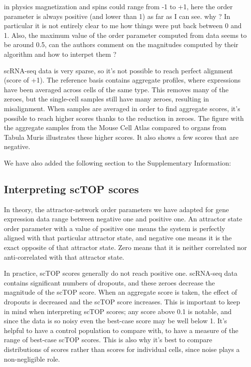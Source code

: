 \documentclass[12pt,american]{scrartcl}
\begin{document}
\begin{revcomment}
    in physics magnetization and spins could range from -1 to +1, here the
 order parameter is always positive (and lower than 1) as far as I can 
see. why ? In particular it is not entirely clear to me how things were 
put back between 0 and 1. Also, the maximum value of the order parameter
 computed from data seems to be around 0.5, can the authors comment on 
the magnitudes computed by their algorithm and how to interpet them ?
\end{revcomment}
\begin{revresponse}
    scRNA-seq data is very sparse, so it’s not possible to reach perfect alignment (score of +1). The reference basis contains aggregate profiles, where expressions have been averaged across cells of the same type. This removes many of the zeroes, but the single-cell samples still have many zeroes, resulting in misalignment. When samples are averaged in order to find aggregate scores, it’s possible to reach higher scores thanks to the reduction in zeroes. The figure with the aggregate samples from the Mouse Cell Atlas compared to organs from Tabula Muris illustrates these higher scores. It also shows a few scores that are negative.
    
    We have also added the following section to the Supplementary Information:
    \begin{changes}
        \subsection*{Interpreting scTOP scores}
        In theory, the attractor-network order parameters we have adapted for gene expression data range between negative one and positive one. An attractor state order parameter with a value of positive one means the system is perfectly aligned with that particular attractor state, and negative one means it is the exact opposite of that attractor state. Zero means that it is neither correlated nor anti-correlated with that attractor state. 
        
        In practice, scTOP scores generally do not reach positive one. scRNA-seq data contains significant numbers of dropouts, and these zeroes decrease the magnitude of the scTOP score. When an aggregate score is taken, the effect of dropouts is decreased and the scTOP score increases. This is important to keep in mind when interpreting scTOP scores; any score above 0.1 is notable, and since the data is so noisy even the best-case score may be well below 1. It's helpful to have a control population to compare with, to have a measure of the range of best-case scTOP scores. This is also why it's best to compare distributions of scores rather than scores for individual cells, since noise plays a non-negligible role.
        

\end{changes}
\end{revresponse}
\end{document}
